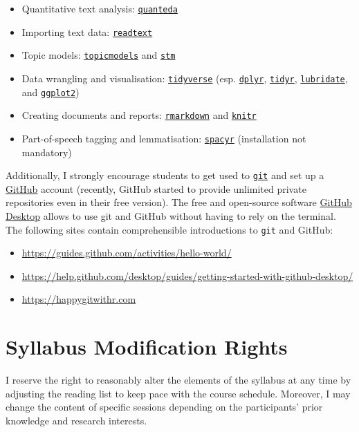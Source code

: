\documentclass[abstract=on,parskip=full,headings=standardclasses,fontsize=11pt,paper=a4]{scrartcl}
\begin{document}
\begin{itemize}
\item Quantitative text analysis: \href{https://quanteda.io/}{\texttt{quanteda}}
\item Importing text data: \href{https://readtext.quanteda.io/}{\texttt{readtext}}
\item Topic models: \href{https://cran.r-project.org/web/packages/topicmodels/index.html}{\texttt{topicmodels}}  and \href{https://www.structuraltopicmodel.com/}{\texttt{stm}}
\item Data wrangling and visualisation: \href{https://www.tidyverse.org}{\texttt{tidyverse}} (esp. \href{https://dplyr.tidyverse.org}{\texttt{dplyr}}, \href{https://tidyr.tidyverse.org}{\texttt{tidyr}}, \href{https://lubridate.tidyverse.org}{\texttt{lubridate}}, and \href{https://ggplot2.tidyverse.org}{\texttt{ggplot2}})
\item Creating documents and reports: \href{https://rmarkdown.rstudio.com}{\texttt{rmarkdown}} and \href{https://yihui.name/knitr/}{\texttt{knitr}}
\item Part-of-speech tagging and lemmatisation: \href{https://spacyr.quanteda.io}{\texttt{spacyr}} (installation not mandatory)
\end{itemize}

Additionally, I strongly encourage students to get used to \href{https://git-scm.com}{\texttt{git}}  and set up a \href{https://github.com}{GitHub} account (recently, GitHub started to provide unlimited private repositories even in their free version). The free  and open-source software \href{https://desktop.github.com}{GitHub Desktop} allows to use git and GitHub without having to rely on the terminal. The following sites contain comprehensible introductions to \texttt{git} and GitHub:
\begin{itemize}
\item \url{https://guides.github.com/activities/hello-world/}
\item \url{https://help.github.com/desktop/guides/getting-started-with-github-desktop/}
\item \url{https://happygitwithr.com}
\end{itemize}


\section*{Syllabus Modification Rights}

I reserve the right to reasonably alter the elements of the syllabus at any time by adjusting the reading list to keep pace with the course schedule. Moreover, I may change the content of specific sessions depending on the participants' prior knowledge and research interests.
\end{document}
